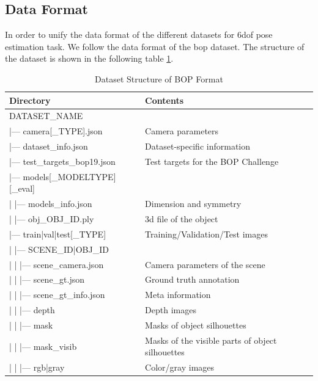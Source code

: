 \documentclass[12pt,DIV14,BCOR12mm,a4paper,footinclude=false,headinclude,parskip=half-,twoside,openright,cleardoublepage=empty,toc=index,bibliography=totoc,listof=totoc]{scrreprt}
\numberwithin{equation}{chapter}
\begin{document}
\subsection{Data Format}
In order to unify the data format of the different datasets for \gls{6dof} pose estimation task. We follow the data format of the \gls{bop} dataset. The structure of the dataset is shown in the following table \ref{tab:dataset}.
\begin{table}[ht]
  \centering
  \caption{Dataset Structure of BOP Format}
  \label{tab:dataset}
  \begin{tabular}{l l}
      \toprule
      Directory & Contents \\
      \midrule
      DATASET\_NAME & \\
      |--- camera[\_TYPE].json & Camera parameters\\
      |--- dataset\_info.json & Dataset-specific information\\
      |--- test\_targets\_bop19.json & Test targets for the BOP Challenge \\
      |--- models[\_MODELTYPE][\_eval] & \\
      | \quad |--- models\_info.json & Dimension and symmetry\\
      | \quad |--- obj\_OBJ\_ID.ply & \gls{3d} file of the object\\
      |--- train|val|test[\_TYPE] & Training/Validation/Test images\\
      | \quad |--- SCENE\_ID|OBJ\_ID & \\
      | \quad | \quad |--- scene\_camera.json & Camera parameters of the scene\\
      | \quad | \quad |--- scene\_gt.json & Ground truth annotation\\
      | \quad | \quad |--- scene\_gt\_info.json & Meta information\\
      | \quad | \quad |--- depth & Depth images\\
      | \quad | \quad |--- mask & Masks of object silhouettes\\
      | \quad | \quad |--- mask\_visib & Masks of the visible parts of object silhouettes\\
      | \quad | \quad |--- rgb|gray & Color/gray images\\
      \bottomrule
  \end{tabular}
\end{table}
\end{document}

